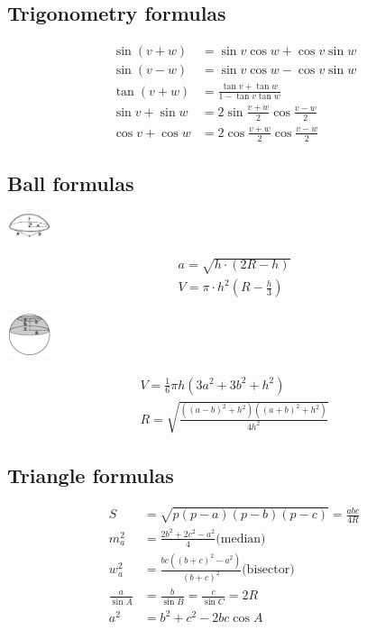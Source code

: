 \subsection*{Trigonometry formulas}
\begin{align*}
\sin(v+w)&=\sin v\cos w+\cos v\sin w\\
\sin(v-w)&=\sin v\cos w-\cos v\sin w\\
\tan(v+w)&=\frac{\tan v+\tan w}{1-\tan v\tan w}\\
\sin v+\sin w&=2\sin\tfrac{v+w}{2}\cos\tfrac{v-w}{2}\\
\cos v+\cos w&=2\cos\tfrac{v+w}{2}\cos\tfrac{v-w}{2}
\end{align*}

\subsection*{Ball formulas}

\begin{center}
  \includegraphics[width=0.1\textwidth]{content/mathematics/ball-segment.png}
\end{center}

\[\begin{array}{cc}
  a = \sqrt{h \cdot (2R - h)}\\
  V = \pi \cdot h^2(R -\frac{h}{3})
\end{array}\]

\begin{center}
  \includegraphics[width=0.1\textwidth, center]{content/mathematics/ball-layer.png}
\end{center}

\[\begin{array}{cc}
  V = \frac{1}{6}\pi h(3a^2+3b^2+h^2)\\
  R = \sqrt{\frac{((a - b)^2 + h^2)((a + b)^2 + h^2)}{4h^2}}
\end{array}\]  

\subsection*{Triangle formulas}
\begin{align*}
S &= \sqrt{p(p - a)(p - b)(p - c)} = \frac{abc}{4R}\\
m_a^2 &= \frac{2b^2 + 2c^2 - a^2}{4} \text{(median)}\\
w_a^2 &= \frac{bc((b + c)^2 - a^2)}{(b + c)^2} \text{(bisector)}\\
\frac{a}{\sin A} &= \frac{b}{\sin B} = \frac{c}{\sin C} = 2R\\
a^2 &= b^2 + c^2 - 2bc\cos A
\end{align*}

